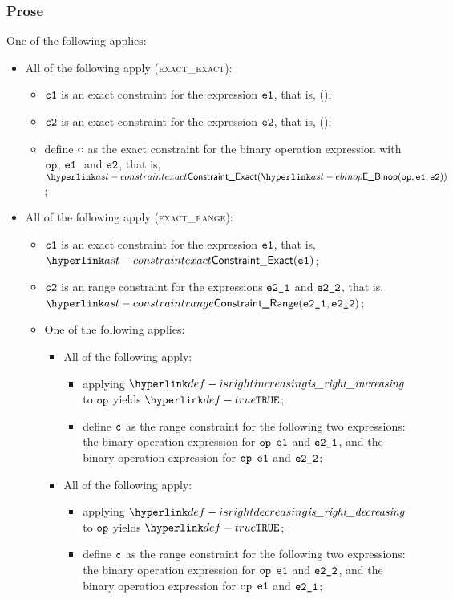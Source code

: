 \subsubsection{Prose}
One of the following applies:
\begin{itemize}
  \item All of the following apply (\textsc{exact\_exact}):
  \begin{itemize}
    \item $\texttt{c1}$ is an exact constraint for the expression $\texttt{e1}$, that is, \ConstraintExact(\veone);
    \item $\texttt{c2}$ is an exact constraint for the expression $\texttt{e2}$, that is, \ConstraintExact(\vetwo);
    \item define $\texttt{c}$ as the exact constraint for the binary operation expression with $\texttt{op}$, $\texttt{e1}$, and $\texttt{e2}$,
          that is, $\ConstraintExact(\EBinop(\op, \veone, \vetwo))$;
  \end{itemize}

  \item All of the following apply (\textsc{exact\_range}):
  \begin{itemize}
    \item $\texttt{c1}$ is an exact constraint for the expression $\texttt{e1}$, that is, $\ConstraintExact(\veone)$;
    \item $\texttt{c2}$ is an range constraint for the expressions $\texttt{e2\_1}$ and $\texttt{e2\_2}$, that is, \\ $\ConstraintRange(\vetwoone, \vetwotwo)$;
    \item One of the following applies:
    \begin{itemize}
      \item All of the following apply:
      \begin{itemize}
          \item applying $\isrightincreasing$ to $\texttt{op}$ yields $\True$;
          \item define $\texttt{c}$ as the range constraint for the following two expressions:
          the binary operation expression for $\texttt{op}$ $\texttt{e1}$ and $\texttt{e2\_1}$, and
          the binary operation expression for $\texttt{op}$ $\texttt{e1}$ and $\texttt{e2\_2}$;
      \end{itemize}

      \item All of the following apply:
      \begin{itemize}
          \item applying $\isrightdecreasing$ to $\texttt{op}$ yields $\True$;
          \item define $\texttt{c}$ as the range constraint for the following two expressions:
          the binary operation expression for $\texttt{op}$ $\texttt{e1}$ and $\texttt{e2\_2}$, and
          the binary operation expression for $\texttt{op}$ $\texttt{e1}$ and $\texttt{e2\_1}$;
      \end{itemize}


\end{itemize}
\end{itemize}
\end{itemize}
